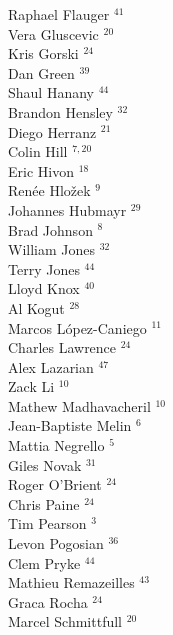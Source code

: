 \documentclass[PICOReport.tex]{subfiles}
\begin{document}
{\begin{multicols}{4}
Raphael Flauger $^{41}$                 \\
Vera Gluscevic $^{20}$                  \\
Kris Gorski $^{24}$                     \\
Dan Green $^{39}$                       \\
Shaul Hanany $^{44}$                    \\
Brandon Hensley $^{32}$                 \\
Diego Herranz $^{21}$                   \\
Colin Hill $^{7, 20}$                      \\
Eric Hivon $^{18}$                      \\
Ren\'{e}e  Hlo\v{z}ek $^{9}$           \\
Johannes Hubmayr $^{29}$                \\
Brad Johnson $^{8}$                    \\
William Jones $^{32}$                   \\
Terry Jones $^{44}$                     \\
Lloyd Knox $^{40}$                      \\
Al Kogut $^{28}$                        \\
Marcos L\'{o}pez-Caniego $^{11}$        \\
Charles Lawrence $^{24}$                \\
Alex Lazarian $^{47}$                   \\
Zack Li $^{10}$                         \\
Mathew Madhavacheril $^{10}$            \\
Jean-Baptiste Melin $^{6}$             \\
Mattia Negrello $^{5}$                 \\
Giles Novak $^{31}$                     \\
Roger O'Brient $^{24}$                  \\
Chris Paine $^{24}$                     \\
Tim Pearson $^{3}$                     \\
Levon Pogosian $^{36}$                  \\
Clem Pryke $^{44}$                      \\
Mathieu Remazeilles $^{43}$             \\
Graca Rocha $^{24}$                     \\
Marcel Schmittfull $^{20}$              \\

\end{multicols}}
\end{document}
